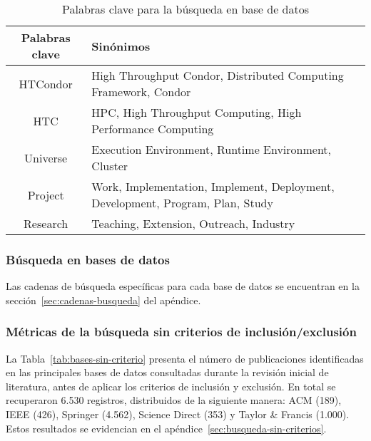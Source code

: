 \begin{table}[H]
	\centering
	\scriptsize
	\setlength{\tabcolsep}{4pt}
	\begin{tabular}{|c|p{11.5cm}|} %
		\hline
		\textbf{Palabras clave} & \textbf{Sinónimos}                                                             \\
		\hline
		HTCondor                & High Throughput Condor, Distributed Computing Framework, Condor                \\
		\hline
		HTC                     & HPC, High Throughput Computing, High Performance Computing                     \\
		\hline
		Universe                & Execution Environment, Runtime Environment, Cluster                            \\
		\hline
		Project                 & Work, Implementation, Implement, Deployment, Development, Program, Plan, Study \\
		\hline
		Research                & Teaching, Extension, Outreach, Industry                                        \\
		\hline
	\end{tabular}
	\caption{Palabras clave para la búsqueda en base de datos}
	\label{tab:keywords}
\end{table}







\subsubsection{Búsqueda en bases de datos}\label{par:busquedaBasesDatos}
\noindent
Las cadenas de búsqueda específicas para cada base de datos se encuentran en la sección~\ref{sec:cadenas-busqueda} del apéndice.

\subsubsection{Métricas de la búsqueda sin criterios de inclusión/exclusión}\label{subsubsec:resumenBusqueda}
\noindent
La Tabla~\ref{tab:bases-sin-criterio} presenta el número de publicaciones identificadas en las principales bases de datos consultadas durante la revisión inicial de literatura, antes de aplicar los criterios de inclusión y exclusión. En total se recuperaron 6.530 registros, distribuidos de la siguiente manera: ACM (189), IEEE (426), Springer (4.562), Science Direct (353) y Taylor \& Francis (1.000). Estos resultados se evidencian en el apéndice~\ref{sec:busqueda-sin-criterios}.

